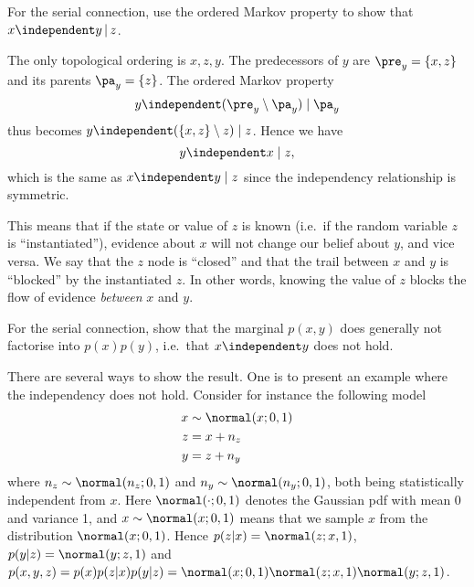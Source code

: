 \begin{exenumerate}
  \item For the serial connection, use the ordered Markov property to show that 
    $x \independent y \,|\, z$.
    \begin{solution}
     The only topological ordering is $x, z, y$. The predecessors of
     $y$ are $\pre_y = \{x, z\}$ and its parents $\pa_y = \{z\}$. The
     ordered Markov property
     \begin{equation}
       y \independent ( \pre_y \setminus \pa_y ) \mid \pa_y
     \end{equation}
     thus becomes $y \independent (\{x, z\} \setminus z) \mid z$. Hence we have
     \begin{equation}
      y \independent x \mid z,
     \end{equation}
     which is the same as $x \independent y \mid z$ since the
     independency relationship is symmetric.

     This means that if the state or value of $z$ is known (i.e.\ if
     the random variable $z$ is ``instantiated''), evidence about $x$
     will not change our belief about $y$, and vice versa. We say that
     the $z$ node is ``closed'' and that the trail between $x$ and $y$
     is ``blocked'' by the instantiated $z$. In other words, knowing
     the value of $z$ blocks the flow of evidence \emph{between} $x$
     and $y$.
     
    \end{solution}
   \item For the serial connection, show that the marginal $p(x,y)$ does generally not factorise into $p(x)p(y)$, i.e.\ that $x \independent y$ does not hold.
     \begin{solution}
       There are several ways to show the result. One is to
       present an example where the independency does not
       hold. Consider for instance the following model
       \begin{align}
         x & \sim \normal(x; 0, 1)\label{eq:serial-x}\\
         z &= x + n_z\\
         y &= z + n_y \label{eq:serial-y}
       \end{align}
       where $n_z \sim \normal(n_z; 0, 1)$ and $n_y \sim \normal(n_y;
       0, 1)$, both being statistically independent from $x$. Here
       $\normal(\cdot; 0, 1)$ denotes the Gaussian pdf with mean 0 and
       variance 1, and $x \sim \normal(x; 0, 1)$ means that we sample
       $x$ from the distribution $\normal(x; 0, 1)$. Hence $p(z|x) =
       \normal(z; x, 1)$, $p(y|z) = \normal(y; z, 1)$ and $p(x, y,z) =
       p(x) p(z|x) p(y|z) = \normal(x; 0, 1) \normal(z; x,
       1)\normal(y; z, 1)$.


\end{solution}
\end{exenumerate}
